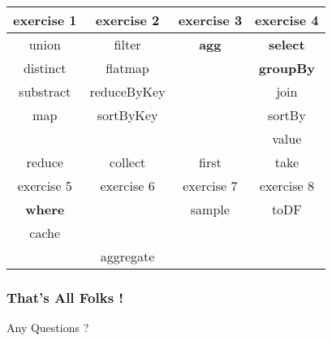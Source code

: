 \documentclass[slidetop,9pt,utf8]{beamer}
\begin{document}
\begin{CJK}{UTF8}{gbsn}
\begin{frame}
  \LARGE
  \begin{center}
    \begin{tabular}{|c|c|c|c|}
      \hline
      \rowcolor{gray} exercise 1 & exercise 2 & exercise 3 & exercise 4 \\ \hline
      union & filter & \textbf{agg} & \textbf{select} \\
      distinct & flatmap & & \textbf{groupBy} \\
      substract & reduceByKey & & join \\
      map & sortByKey & & sortBy \\ 
       & & & value \\ \hline
      \rowcolor{lightgray} reduce & collect & first & take \\ \hline
      \rowcolor{gray} exercise 5 & exercise 6 & exercise 7 & exercise 8 \\ \hline
      \textbf{where} & & sample & toDF \\
      cache & & & \\ \hline
      \rowcolor{lightgray}   & aggregate & & \\ \hline
    \end{tabular}
  \end{center}
  \normalsize
\end{frame}

\begin{frame}

  \frametitle{That's All Folks !}
  
  
  \begin{center}
    \Huge Any Questions ?\normalsize
  \end{center}
\end{frame}


\end{CJK}
\end{document}
